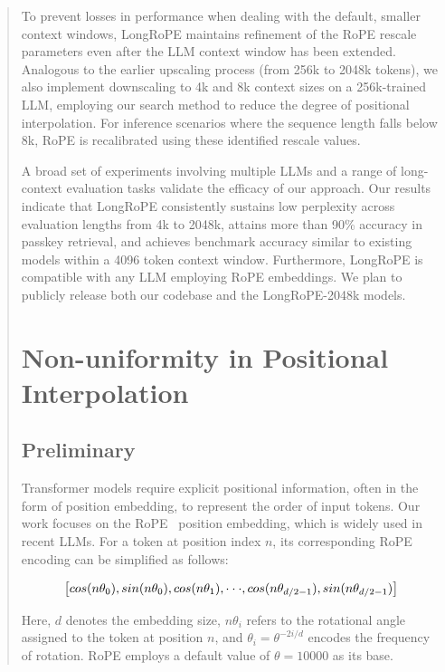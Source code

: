 \begin{abstract}
To prevent losses in performance when dealing with the default, smaller context windows, {LongRoPE} maintains refinement of the RoPE rescale parameters even after the LLM context window has been extended. Analogous to the earlier upscaling process (from 256k to 2048k tokens), we also implement downscaling to 4k and 8k context sizes on a 256k-trained LLM, employing our search method to reduce the degree of positional interpolation. For inference scenarios where the sequence length falls below 8k, RoPE is recalibrated using these identified rescale values.

A broad set of experiments involving multiple LLMs and a range of long-context evaluation tasks validate the efficacy of our approach. Our results indicate that LongRoPE consistently sustains low perplexity across evaluation lengths from 4k to 2048k, attains more than 90\% accuracy in passkey retrieval, and achieves benchmark accuracy similar to existing models within a 4096 token context window. Furthermore, LongRoPE is compatible with any LLM employing RoPE embeddings. We plan to publicly release both our codebase and the LongRoPE-2048k models.

\section{Non-uniformity in Positional Interpolation}
\label{sec:analysis}

\subsection{Preliminary}

Transformer models require explicit positional information, often in the form of position embedding, to represent the order of input tokens. Our work focuses on the RoPE~\cite{rope} position embedding, which is widely used in recent  LLMs. For a token at position index $n$, its corresponding RoPE encoding can be simplified as follows:

\begin{equation}
		\fontsize{7.8}{7.8} \selectfont
	\label{eq:rope}
	\left[ cos(n\theta_0), sin(n\theta_0), cos(n\theta_1), \cdot\cdot\cdot, cos(n\theta_{d/2-1}), sin(n\theta_{d/2-1}) \right]   
\end{equation}

Here, $d$ denotes the embedding size, $n\theta_i$ refers to the rotational angle assigned to the token at position $n$, and $\theta_i=\theta^{-2i/d}$ encodes the frequency of rotation. RoPE employs a default value of $\theta=10000$ as its base.


\end{abstract}
